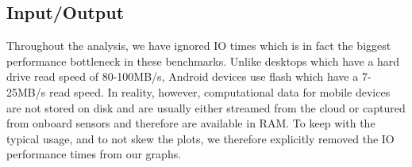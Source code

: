 \subsection{Input/Output}

Throughout the analysis, we have ignored IO times which is in fact the biggest performance bottleneck in these benchmarks.
Unlike desktops which have a hard drive read speed of 80-100MB/s, Android devices use flash which have a 7-25MB/s read speed.
In reality, however, computational data for mobile devices are not stored on disk and are usually either streamed from the cloud or captured from onboard sensors and therefore are available in RAM.
To keep with the typical usage, and to not skew the plots, we therefore explicitly removed the IO performance times from our graphs.
